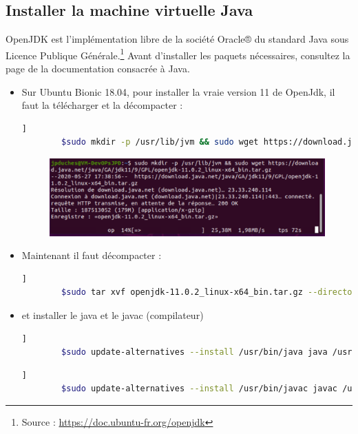 	
	\subsection{Installer la machine virtuelle Java}
	
	OpenJDK est l'implémentation libre de la société Oracle® du standard Java sous Licence Publique Générale.\footnote{Source : \url{https://doc.ubuntu-fr.org/openjdk} }
	Avant d'installer les paquets nécessaires, consultez la page de la documentation consacrée à Java. 
	
	
	\begin{itemize}
		\item  Sur Ubuntu Bionic 18.04, pour installer la vraie version 11 de OpenJdk, il faut la télécharger et la décompacter :
		\begin{lstlisting}[language=bash]   ]
		$sudo mkdir -p /usr/lib/jvm && sudo wget https://download.java.net/java/GA/jdk11/9/GPL/openjdk-11.0.2_linux-x64_bin.tar.gz 
		\end{lstlisting}
		
		\begin{figure}[!h]
			\centering
			\includegraphics[scale=0.5]{images/capture1}
			
		\end{figure}
		\item Maintenant il faut décompacter : 
		\begin{lstlisting}[language=bash]   ]
		$sudo tar xvf openjdk-11.0.2_linux-x64_bin.tar.gz --directory /usr/lib/jvm/
		\end{lstlisting}
		\item et installer le java et le javac (compilateur)
		\begin{lstlisting}[language=bash]   ]
		$sudo update-alternatives --install /usr/bin/java java /usr/lib/jvm/jdk-11.0.2/bin/java 1
		\end{lstlisting}
		
		\begin{lstlisting}[language=bash]   ]
		$sudo update-alternatives --install /usr/bin/javac javac /usr/lib/jvm/jdk-11.0.2/bin/javac 1
		\end{lstlisting}
		

\end{itemize}
